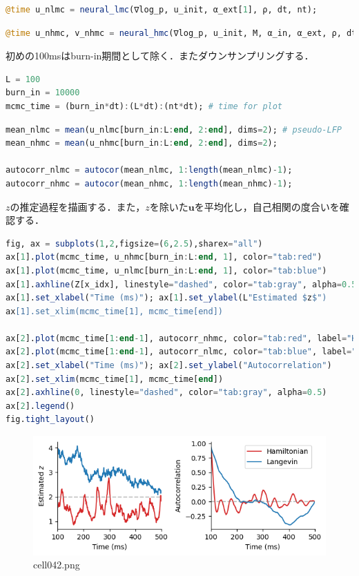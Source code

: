 \begin{lstlisting}[language=julia]
@time u_nlmc = neural_lmc(∇log_p, u_init, α_ext[1], ρ, dt, nt);
\end{lstlisting}
\begin{lstlisting}[language=julia]
@time u_nhmc, v_nhmc = neural_hmc(∇log_p, u_init, M, α_in, α_ext, ρ, dt, nt);
\end{lstlisting}
初めの100msはburn-in期間として除く．またダウンサンプリングする．
\begin{lstlisting}[language=julia]
L = 100
burn_in = 10000
mcmc_time = (burn_in*dt):(L*dt):(nt*dt); # time for plot
\end{lstlisting}
\begin{lstlisting}[language=julia]
mean_nlmc = mean(u_nlmc[burn_in:L:end, 2:end], dims=2); # pseudo-LFP
mean_nhmc = mean(u_nhmc[burn_in:L:end, 2:end], dims=2);

autocorr_nlmc = autocor(mean_nlmc, 1:length(mean_nlmc)-1);
autocorr_nhmc = autocor(mean_nhmc, 1:length(mean_nhmc)-1);
\end{lstlisting}
$z$の推定過程を描画する．また，$z$を除いた$\mathbf{u}$を平均化し，自己相関の度合いを確認する．
\begin{lstlisting}[language=julia]
fig, ax = subplots(1,2,figsize=(6,2.5),sharex="all")
ax[1].plot(mcmc_time, u_nhmc[burn_in:L:end, 1], color="tab:red")
ax[1].plot(mcmc_time, u_nlmc[burn_in:L:end, 1], color="tab:blue")
ax[1].axhline(Z[x_idx], linestyle="dashed", color="tab:gray", alpha=0.5)
ax[1].set_xlabel("Time (ms)"); ax[1].set_ylabel(L"Estimated $z$")
ax[1].set_xlim(mcmc_time[1], mcmc_time[end])

ax[2].plot(mcmc_time[1:end-1], autocorr_nhmc, color="tab:red", label="Hamiltonian")
ax[2].plot(mcmc_time[1:end-1], autocorr_nlmc, color="tab:blue", label="Langevin")
ax[2].set_xlabel("Time (ms)"); ax[2].set_ylabel("Autocorrelation")
ax[2].set_xlim(mcmc_time[1], mcmc_time[end])
ax[2].axhline(0, linestyle="dashed", color="tab:gray", alpha=0.5)
ax[2].legend()
fig.tight_layout()
\end{lstlisting}
\begin{figure}[ht]
	\centering
	\includegraphics[scale=0.8, max width=\linewidth]{./fig/bayesian-brain/neural-sampling/cell042.png}
	\caption{cell042.png}
	\label{cell042.png}
\end{figure}
